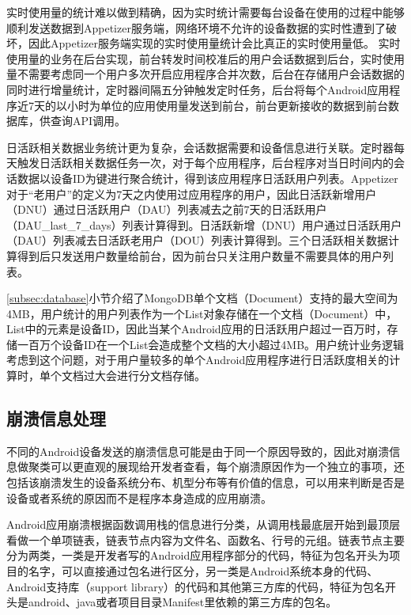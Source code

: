 实时使用量的统计难以做到精确，因为实时统计需要每台设备在使用的过程中能够顺利发送数据到Appetizer服务端，网络环境不允许的设备数据的实时性遭到了破坏，因此Appetizer服务端实现的实时使用量统计会比真正的实时使用量低。
实时使用量的业务在后台实现，前台转发时间校准后的用户会话数据到后台，实时使用量不需要考虑同一个用户多次开启应用程序合并次数，后台在存储用户会话数据的同时进行增量统计，定时器间隔五分钟触发定时任务，后台将每个Android应用程序近7天的以小时为单位的应用使用量发送到前台，前台更新接收的数据到前台数据库，供查询API调用。

日活跃相关数据业务统计更为复杂，会话数据需要和设备信息进行关联。定时器每天触发日活跃相关数据任务一次，对于每个应用程序，后台程序对当日时间内的会话数据以设备ID为键进行聚合统计，得到该应用程序日活跃用户列表。Appetizer对于“老用户”的定义为7天之内使用过应用程序的用户，因此日活跃新增用户（DNU）通过日活跃用户（DAU）列表减去之前7天的日活跃用户（DAU\_last\_7\_days）列表计算得到。日活跃新增（DNU）用户通过日活跃用户（DAU）列表减去日活跃老用户（DOU）列表计算得到。三个日活跃相关数据计算得到后只发送用户数量给前台，因为前台只关注用户数量不需要具体的用户列表。

\ref{subsec:database}小节介绍了MongoDB单个文档（Document）支持的最大空间为4MB，用户统计的用户列表作为一个List对象存储在一个文档（Document）中，List中的元素是设备ID，因此当某个Android应用的日活跃用户超过一百万时，存储一百万个设备ID在一个List会造成整个文档的大小超过4MB。用户统计业务逻辑考虑到这个问题，对于用户量较多的单个Android应用程序进行日活跃度相关的计算时，单个文档过大会进行分文档存储。

\subsection{崩溃信息处理}
\label{subsec:crashcomputing}

不同的Android设备发送的崩溃信息可能是由于同一个原因导致的，因此对崩溃信息做聚类可以更直观的展现给开发者查看，每个崩溃原因作为一个独立的事项，还包括该崩溃发生的设备系统分布、机型分布等有价值的信息，可以用来判断是否是设备或者系统的原因而不是程序本身造成的应用崩溃。

Android应用崩溃根据函数调用栈的信息进行分类，从调用栈最底层开始到最顶层看做一个单项链表，链表节点内容为文件名、函数名、行号的元组。链表节点主要分为两类，一类是开发者写的Android应用程序部分的代码，特征为包名开头为项目的名字，可以直接通过包名进行区分，另一类是Android系统本身的代码、Android支持库（support library）的代码和其他第三方库的代码，特征为包名开头是android、java或者项目目录Manifest里依赖的第三方库的包名。

